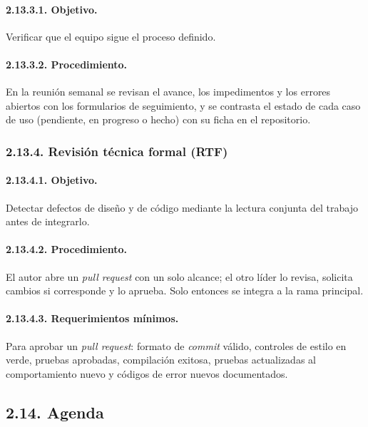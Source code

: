 \paragraph{2.13.3.1. Objetivo.}

Verificar que el equipo sigue el proceso definido.

\paragraph{2.13.3.2. Procedimiento.}

En la reunión semanal se revisan el avance, los impedimentos y los errores abiertos con los formularios de seguimiento, y se contrasta el estado de cada caso de uso (pendiente, en progreso o hecho) con su ficha en el repositorio.

\subsubsection{2.13.4. Revisión técnica formal (RTF)}

\paragraph{2.13.4.1. Objetivo.}

Detectar defectos de diseño y de código mediante la lectura conjunta del trabajo antes de integrarlo.

\paragraph{2.13.4.2. Procedimiento.}

El autor abre un \textit{pull request} con un solo alcance; el otro líder lo revisa, solicita cambios si corresponde y lo aprueba. Solo entonces se integra a la rama principal.

\paragraph{2.13.4.3. Requerimientos mínimos.}

Para aprobar un \textit{pull request}: formato de \textit{commit} válido, controles de estilo en verde, pruebas aprobadas, compilación exitosa, pruebas actualizadas al comportamiento nuevo y códigos de error nuevos documentados.

\subsection{2.14. Agenda}\label{sec:agenda_sqap}

